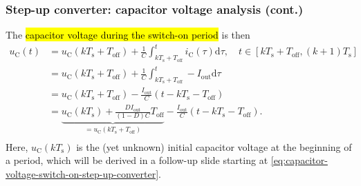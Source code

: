 \begin{frame}
    \frametitle{Step-up converter: capacitor voltage analysis (cont.)}
     The \hl{capacitor voltage during the switch-on period} is then
    \begin{equation}
        \begin{split}
            u_\mathrm{C}(t) &= u_\mathrm{C}(kT_\mathrm{s}+T_\mathrm{off}) + \frac{1}{C}\int_{kT_\mathrm{s}+T_\mathrm{off}}^t i_\mathrm{C}(\tau) \mathrm{d}\tau , \quad t\in [k T_\mathrm{s}+T_\mathrm{off}, (k+1) T_\mathrm{s}]\\
            &= u_\mathrm{C}(kT_\mathrm{s}+T_\mathrm{off}) + \frac{1}{C}\int_{kT_\mathrm{s}+T_\mathrm{off}}^t -I_\mathrm{out} \mathrm{d}\tau\\
                &= u_\mathrm{C}(kT_\mathrm{s}+T_\mathrm{off}) - \frac{I_\mathrm{out}}{C}(t-kT_\mathrm{s}-T_\mathrm{off})\\
                &= \underbrace{u_\mathrm{C}(kT_\mathrm{s}) + \frac{DI_\mathrm{out}}{(1-D)C}T_\mathrm{off}}_{=u_\mathrm{C}(kT_\mathrm{s}+T_\mathrm{off})} - \frac{I_\mathrm{out}}{C}(t-kT_\mathrm{s}-T_\mathrm{off}).\\
        \end{split}
        \label{eq:capacitor-voltage-switch-on-step-up-converter}
    \end{equation}
    Here, $u_\mathrm{C}(kT_\mathrm{s})$ is the (yet unknown)  initial capacitor voltage at the beginning of a period, which will be derived in a follow-up slide starting at \eqref{eq:capacitor-voltage-switch-on-step-up-converter}. 
\end{frame}


